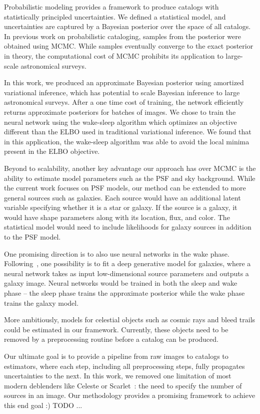 Probabilistic modeling provides a framework to 
produce catalogs with statistically principled uncertainties.
We defined a statistical model, and uncertainties are captured by a Bayesian posterior over the space of all catalogs.
In previous work on probabilistic cataloging, samples from the posterior were obtained using MCMC. 
While samples eventually converge to the exact posterior in theory, the computational cost of MCMC prohibits its application to large-scale astronomical surveys. 

In this work, we produced an approximate Bayesian posterior using amortized variational inference, which has potential to scale Bayesian inference to large astronomical surveys.
After a one time cost of training, the network efficiently returns approximate posteriors for batches of images.
We chose to train the neural network using the wake-sleep algorithm which optimizes an objective different than the ELBO used in traditional variational inference. 
We found that in this application, the wake-sleep algorithm was able to avoid the local minima present in the ELBO objective. 

Beyond to scalability, another key advantage our approach has over MCMC is the ability to estimate model parameters such as the PSF and sky background.
While the current work focuses on PSF models, our method can be extended to more general sources such as galaxies.
Each source would have an additional latent variable specifying whether it is a star or galaxy. If the source is a galaxy, it would have shape parameters along with its location, flux, and color. The statistical model would need to include likelihoods for galaxy sources in addition to the PSF model.

One promising direction is to also use neural networks in the wake phase. Following~\cite{Regier2015ADG}, one possibility is to fit a deep generative model for galaxies, where a neural network takes as input low-dimensional source parameters and outputs a galaxy image. Neural networks would be trained in both the sleep and wake phase -- the sleep phase trains the approximate posterior while the wake phase trains the galaxy model. 

More ambitiously, models for celestial objects such as cosmic rays and bleed trails could be estimated in our framework. Currently, these objects need to be removed by a preprocessing routine before a catalog can be produced. 

Our ultimate goal is to provide a pipeline from raw images to catalogs to estimators, where each step, including all preprocessing steps, fully propagates uncertainties to the next. In this work, we removed one limitation of most modern deblenders like Celeste or Scarlet~\cite{scarlet2018}: the need to specify the number of sources in an image. 
Our methodology provides a promising framework to achieve this end goal :) TODO ... 
